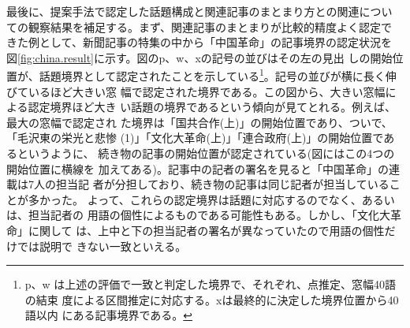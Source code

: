 最後に、提案手法で認定した話題構成と関連記事のまとまり方との関連につい
ての観察結果を補足する。まず、関連記事のまとまりが比較的精度よく認定で
きた例として、新聞記事の特集の中から「中国革命」の記事境界の認定状況を
図\ref{fig:china.result}に示す。図のp、w、xの記号の並びはその左の見出
しの開始位置が、話題境界として認定されたことを示している\footnote{p、w
  は上述の評価で一致と判定した境界で、それぞれ、点推定、窓幅40語の結束
  度による区間推定に対応する。xは最終的に決定した境界位置から40語以内
  にある記事境界である。}。記号の並びが横に長く伸びているほど大きい窓
幅で認定された境界である。この図から、大きい窓幅による認定境界ほど大き
い話題の境界であるという傾向が見てとれる。例えば、最大の窓幅で認定され
た境界は「国共合作(上)」の開始位置であり、ついで、「毛沢東の栄光と悲惨
(1)」「文化大革命(上)」「連合政府(上)」の開始位置であるというように、
続き物の記事の開始位置が認定されている(図にはこの4つの開始位置に横線を
加えてある)。記事中の記者の署名を見ると「中国\vspace{-1mm}革命」の連載は7人の担当記
者が分担しており、続き物の記事は同じ記者が担当していることが多かった。
よって、これらの認定境界は話題に対応するのでなく、あるいは、担当記者の
用語の個性によるものである可能性もある。しかし、「文化大革命」に関して
は、上中と下の担当記者の署名が異なっていたので用語の個性だけでは説明で
きない一致といえる。

